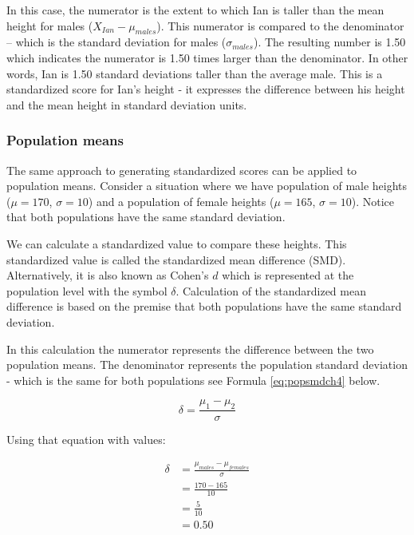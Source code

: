 \documentclass[
]{krantz}
\begin{document}
In this case, the numerator is the extent to which Ian is taller than the mean height for males (\(X_{Ian} - \mu_{males}\)). This numerator is compared to the denominator -- which is the standard deviation for males (\(\sigma_{males}\)). The resulting number is 1.50 which indicates the numerator is 1.50 times larger than the denominator. In other words, Ian is 1.50 standard deviations taller than the average male. This is a standardized score for Ian's height - it expresses the difference between his height and the mean height in standard deviation units.

\hypertarget{population-means}{%
\subsubsection{Population means}\label{population-means}}

The same approach to generating standardized scores can be applied to population means. Consider a situation where we have population of male heights (\(\mu = 170\), \(\sigma = 10\)) and a population of female heights (\(\mu = 165\), \(\sigma = 10\)). Notice that both populations have the same standard deviation.

We can calculate a standardized value to compare these heights. This standardized value is called the standardized mean difference (SMD). Alternatively, it is also known as Cohen's \(d\) which is represented at the population level with the symbol \(\delta\). Calculation of the standardized mean difference is based on the premise that both populations have the same standard deviation.

In this calculation the numerator represents the difference between the two population means. The denominator represents the population standard deviation - which is the same for both populations see Formula \eqref{eq:popsmdch4} below.

\begin{equation} 
\delta =  \frac{\mu_{1} - \mu_{2}}{\sigma}
      \label{eq:popsmdch4}
\end{equation}

Using that equation with values:

\[
\begin{aligned} 
\delta &=  \frac{\mu_{males} - \mu_{females}}{\sigma}\\ 
&=  \frac{170 - 165}{10}\\
&=  \frac{5}{10}\\
&= 0.50
\end{aligned} 
\]
\end{document}
